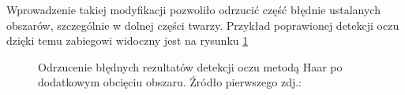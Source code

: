 Wprowadzenie takiej modyfikacji pozwoliło odrzucić część błędnie ustalanych obszarów, szczególnie w dolnej części twarzy. Przykład poprawionej detekcji oczu dzięki temu zabiegowi widoczny jest na rysunku \ref{fig:eye_detect_crop}

\begin{figure}[!h]
    \begin{center}
        \hspace{8mm}
    \end{center}
    \caption{Odrzucenie błędnych rezultatów detekcji oczu metodą Haar po dodatkowym obcięciu obszaru. Źródło pierwszego zdj.:\cite{readheadPortrait2}}
    \label{fig:eye_detect_crop}
\end{figure}


